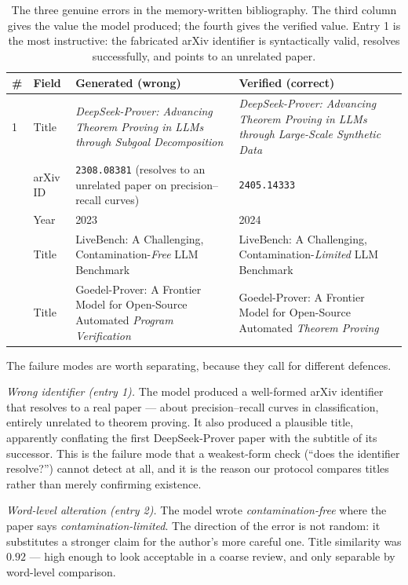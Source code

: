 \documentclass[11pt,a4paper]{article}
\begin{document}
\begin{table}[t]
\centering
\caption{The three genuine errors in the memory-written bibliography. The third
column gives the value the model produced; the fourth gives the verified value.
Entry 1 is the most instructive: the fabricated arXiv identifier is
syntactically valid, resolves successfully, and points to an unrelated paper.}
\label{tab:errors}
\small
\begin{tabularx}{\textwidth}{@{}l l X X@{}}
\toprule
\textbf{\#} & \textbf{Field} & \textbf{Generated (wrong)} & \textbf{Verified (correct)} \\
\midrule
1 & Title & \emph{DeepSeek-Prover: Advancing Theorem Proving in LLMs through Subgoal Decomposition} &
\emph{DeepSeek-Prover: Advancing Theorem Proving in LLMs through Large-Scale Synthetic Data} \\
 & arXiv ID & \texttt{2308.08381} (resolves to an unrelated paper on precision--recall curves) &
\texttt{2405.14333} \\
 & Year & 2023 & 2024 \\
\addlinespace
2 & Title & LiveBench: A Challenging, Contamination-\emph{Free} LLM Benchmark &
LiveBench: A Challenging, Contamination-\emph{Limited} LLM Benchmark \\
\addlinespace
3 & Title & Goedel-Prover: A Frontier Model for Open-Source Automated \emph{Program Verification} &
Goedel-Prover: A Frontier Model for Open-Source Automated \emph{Theorem Proving} \\
\bottomrule
\end{tabularx}
\end{table}

The failure modes are worth separating, because they call for different
defences.

\emph{Wrong identifier (entry 1).} The model produced a well-formed arXiv
identifier that resolves to a real paper --- about precision--recall curves in
classification, entirely unrelated to theorem proving. It also produced a
plausible title, apparently conflating the first DeepSeek-Prover paper with the
subtitle of its successor. This is the failure mode that a weakest-form check
(``does the identifier resolve?'') cannot detect at all, and it is the reason
our protocol compares titles rather than merely confirming existence.

\emph{Word-level alteration (entry 2).} The model wrote
\emph{contamination-free} where the paper says \emph{contamination-limited}.
The direction of the error is not random: it substitutes a stronger claim for
the author's more careful one. Title similarity was $0.92$ --- high enough to
look acceptable in a coarse review, and only separable by word-level
comparison.
\end{document}
